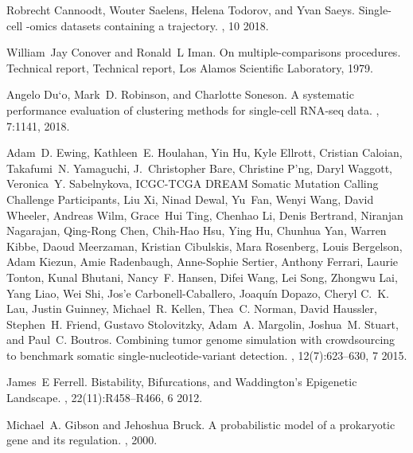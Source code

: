 \documentclass[10pt, a4paper]{article}
\begin{document}
\begin{thebibliography}{10}
	Robrecht Cannoodt, Wouter Saelens, Helena Todorov, and Yvan Saeys.
	\newblock Single-cell -omics datasets containing a trajectory.
	, 10 2018.
	
	William~Jay Conover and Ronald~L Iman.
	\newblock On multiple-comparisons procedures.
	\newblock Technical report, {Technical report, Los Alamos Scientific
		Laboratory}, 1979.
	
	Angelo Du{\a`o}, Mark~D. Robinson, and Charlotte Soneson.
	\newblock A systematic performance evaluation of clustering methods for
	single-cell {{RNA}}-seq data.
	, 7:1141, 2018.
	
	Adam~D. Ewing, Kathleen~E. Houlahan, Yin Hu, Kyle Ellrott, Cristian Caloian,
	Takafumi~N. Yamaguchi, J.~Christopher Bare, Christine P'ng, Daryl Waggott,
	Veronica~Y. Sabelnykova, {ICGC-TCGA DREAM Somatic Mutation Calling Challenge
		Participants}, Liu Xi, Ninad Dewal, Yu~Fan, Wenyi Wang, David Wheeler,
	Andreas Wilm, Grace~Hui Ting, Chenhao Li, Denis Bertrand, Niranjan Nagarajan,
	Qing-Rong Chen, Chih-Hao Hsu, Ying Hu, Chunhua Yan, Warren Kibbe, Daoud
	Meerzaman, Kristian Cibulskis, Mara Rosenberg, Louis Bergelson, Adam Kiezun,
	Amie Radenbaugh, Anne-Sophie Sertier, Anthony Ferrari, Laurie Tonton, Kunal
	Bhutani, Nancy~F. Hansen, Difei Wang, Lei Song, Zhongwu Lai, Yang Liao, Wei
	Shi, Jos{\a'e} Carbonell-Caballero, Joaqu\'in Dopazo, Cheryl C.~K. Lau,
	Justin Guinney, Michael~R. Kellen, Thea~C. Norman, David Haussler, Stephen~H.
	Friend, Gustavo Stolovitzky, Adam~A. Margolin, Joshua~M. Stuart, and Paul~C.
	Boutros.
	\newblock Combining tumor genome simulation with crowdsourcing to benchmark
	somatic single-nucleotide-variant detection.
	, 12(7):623--630, 7 2015.
	
	James~E Ferrell.
	\newblock Bistability, {{Bifurcations}}, and {{Waddington}}'s {{Epigenetic
			Landscape}}.
	, 22(11):R458--R466, 6 2012.
	
	Michael~A. Gibson and Jehoshua Bruck.
	\newblock A probabilistic model of a prokaryotic gene and its regulation.
	, 2000.
	

\end{thebibliography}
\end{document}
